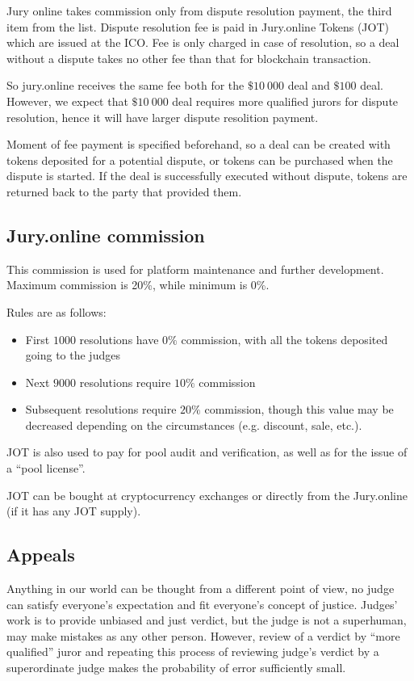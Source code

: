 \documentclass[12pt]{article}
\begin{document}
Jury online takes commission only from dispute resolution payment, the third item from the list.
Dispute resolution fee is paid in Jury.online Tokens (JOT) which are issued at the ICO. Fee is only charged in case of
resolution, so a deal without a dispute takes no other fee than that for blockchain transaction.

So jury.online receives the same fee both for the $\$10\ 000$ deal and $\$100$ deal. However, we expect that $\$10\ 000$ deal
requires more qualified jurors for dispute resolution, hence it will have larger dispute resolition payment.

Moment of fee payment is specified beforehand, so a deal can be created with tokens deposited for a potential dispute, or tokens can be
purchased when the dispute is started. If the deal is successfully executed without dispute, tokens are returned back to the party that
provided them. 

\subsection{Jury.online commission}

This commission is used for platform maintenance and further development. Maximum commission is 20\%, while minimum is 0\%. 

Rules are as follows:
\begin{itemize}
		\item First $1000$ resolutions have $0\%$ commission, with all the tokens deposited going to the judges
		\item Next $9000$ resolutions require $10\%$ commission
		\item Subsequent resolutions require $20\%$ commission, though this value may be decreased depending on the circumstances
				(e.g. discount, sale, etc.).
\end{itemize}

JOT is also used to pay for pool audit and verification, as well as for the issue of a ``pool license''.

JOT can be bought at cryptocurrency exchanges or directly from the Jury.online (if it has any JOT supply).

\subsection{Appeals}
Anything in our world can be thought from a different point of view, no judge can satisfy everyone's expectation
and fit everyone's concept of justice. Judges' work is to provide unbiased and just verdict, but the judge is not a
superhuman, may make mistakes as any other person. However, review of a verdict by ``more qualified'' juror and repeating
this process of reviewing judge's verdict by a superordinate judge makes the probability of error sufficiently small. 
\end{document}
